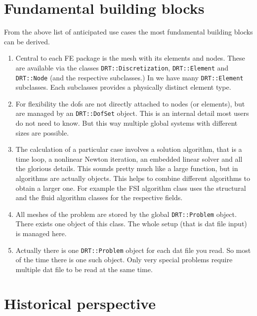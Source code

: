 \section{Fundamental building blocks}

From the above list of anticipated use cases the most fundamental building
blocks can be derived.

\begin{enumerate}

\item Central to each FE package is the mesh with its elements and
nodes. These are available via the classes \texttt{DRT::Discretization},
\texttt{DRT::Element} and \texttt{DRT::Node} (and the respective subclasses.)
In \baci{} we have many \texttt{DRT::Element} subclasses. Each subclasses
provides a physically distinct element type.

\item For flexibility the dofs are not directly attached to nodes (or
elements), but are managed by an \texttt{DRT::DofSet} object. This is an
internal detail most users do not need to know. But this way multiple
global systems with different sizes are possible.

\item The calculation of a particular case involves a solution
algorithm, that is a time loop, a nonlinear Newton iteration, an embedded
linear solver and all the glorious details. This sounds pretty much like a
large function, but in \baci{} algorithms are actually objects. This helps to
combine different algorithms to obtain a larger one. For example the FSI
algorithm class uses the structural and the fluid algorithm classes for the
respective fields.

\item All meshes of the problem are stored by the global \texttt{DRT::Problem}
object. There exists one object of this class. The whole setup (that is dat
file input) is managed here. 

\item Actually there is one \texttt{DRT::Problem} object for each dat file you
read. So most of the time there is one such object. Only very special problems
require multiple dat file to be read at the same time.

\end{enumerate}

\section{Historical perspective}

